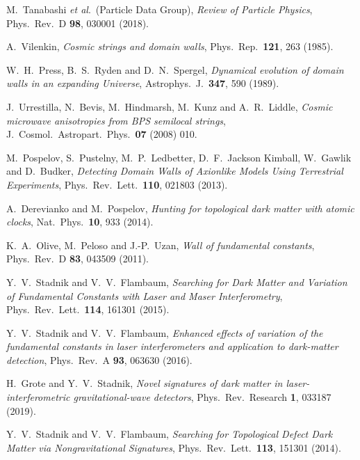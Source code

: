 \documentclass[aps,prd,onecolumn,nofootinbib]{revtex4-2} %
\begin{document}
\begin{thebibliography}{99}
\normalsize

 M.~Tanabashi \textit{et al}.~(Particle Data Group), \textit{Review of Particle Physics}, Phys.~Rev.~D \textbf{98}, 030001 (2018). 

 A.~Vilenkin, \textit{Cosmic strings and domain walls}, Phys.~Rep.~\textbf{121}, 263 (1985). 

 W.~H.~Press, B.~S.~Ryden and D.~N.~Spergel, \textit{Dynamical evolution of domain walls in an expanding Universe}, Astrophys.~J.~\textbf{347}, 590 (1989). 

 J.~Urrestilla, N.~Bevis, M.~Hindmarsh, M.~Kunz and A.~R.~Liddle, \textit{Cosmic microwave anisotropies from BPS semilocal strings}, J.~Cosmol.~Astropart.~Phys.~\textbf{07} (2008) 010. 

 M.~Pospelov, S.~Pustelny, M.~P.~Ledbetter, D.~F.~Jackson Kimball, W.~Gawlik and D.~Budker, \textit{Detecting Domain Walls of Axionlike Models Using Terrestrial Experiments}, Phys.~Rev.~Lett.~\textbf{110}, 021803 (2013). 

 A.~Derevianko and M.~Pospelov, \textit{Hunting for topological dark matter with atomic clocks}, Nat.~Phys.~\textbf{10}, 933 (2014). 

 K.~A.~Olive, M.~Peloso and J.-P.~Uzan, \textit{Wall of fundamental constants}, Phys.~Rev.~D \textbf{83}, 043509 (2011). 

 Y.~V.~Stadnik and V.~V.~Flambaum, \textit{Searching for Dark Matter and Variation of Fundamental Constants with Laser and Maser Interferometry}, Phys.~Rev.~Lett.~\textbf{114}, 161301 (2015). 

 Y.~V.~Stadnik and V.~V.~Flambaum, \textit{Enhanced effects of variation of the fundamental constants in laser interferometers and application to dark-matter detection}, Phys.~Rev.~A \textbf{93}, 063630 (2016). 

 H.~Grote and Y.~V.~Stadnik, \textit{Novel signatures of dark matter in laser-interferometric gravitational-wave detectors}, Phys.~Rev.~Research \textbf{1}, 033187 (2019). 

 Y.~V.~Stadnik and V.~V.~Flambaum, \textit{Searching for Topological Defect Dark Matter via Nongravitational Signatures}, Phys.~Rev.~Lett.~\textbf{113}, 151301 (2014). 



\end{thebibliography}
\end{document}
